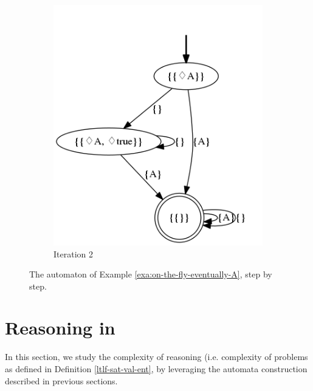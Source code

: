 \begin{example}
\begin{figure}[h]
		\begin{subfigure}[b]{0.5\textwidth}
			\includegraphics[width=\textwidth]{images/on-the-fly-eventually-A-it-complete}
			\caption{Iteration 2}
			\label{fig:exa-on-the-fly-eventually-A-it-complete}
		\end{subfigure}
		\caption{The automaton of Example \ref{exa:on-the-fly-eventually-A}, step by step.}\label{fig:exa-on-the-fly-eventually-A}
	\end{figure}
	
	
\end{example}


\section{Reasoning in \LLf}
In this section, we study the complexity of \LLf reasoning (i.e. complexity of problems as defined in Definition \ref{ltlf-sat-val-ent}, by leveraging the automata construction described in previous sections.


